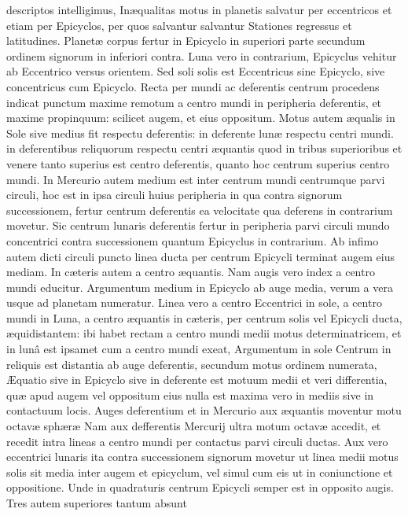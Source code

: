 \documentclass[11pt,a4paper]{article}
\begin{document}
descriptos intelligimus, Inæqualitas motus in planetis salvatur per eccentricos et etiam per Epicyclos, per quos salvantur salvantur Stationes regressus et latitudines.
Planetæ corpus fertur in Epicyclo in superiori parte secundum ordinem signorum in inferiori contra. Luna vero in contrarium, Epicyclus vehitur ab Eccentrico versus orientem. Sed soli solis est Eccentricus sine Epicyclo, sive concentricus cum Epicyclo. Recta per mundi ac deferentis centrum procedens indicat punctum maxime remotum a centro mundi in peripheria deferentis, et maxime propinquum: scilicet augem, et eius oppositum. Motus autem æqualis in Sole sive medius fit respectu deferentis: in deferente lunæ respectu centri mundi. in deferentibus reliquorum respectu centri æquantis quod in tribus superioribus et venere tanto superius est centro deferentis, quanto hoc centrum superius centro mundi. In Mercurio autem medium est inter centrum mundi centrumque parvi circuli, hoc est in ipsa circuli huius peripheria in qua contra signorum successionem, fertur centrum deferentis ea velocitate qua deferens in contrarium movetur. Sic centrum lunaris deferentis fertur in peripheria parvi circuli mundo concentrici contra successionem quantum Epicyclus in contrarium. Ab infimo autem dicti circuli puncto linea ducta per centrum Epicycli terminat augem eius mediam. In cæteris autem a centro æquantis. Nam augis vero index a centro mundi educitur. Argumentum medium in Epicyclo ab auge media, verum a vera usque ad planetam numeratur. Linea vero a centro Eccentrici in sole, a centro mundi in Luna, a centro æquantis in cæteris, per centrum solis vel Epicycli ducta, æquidistantem: ibi habet rectam a centro mundi medii motus determinatricem, et in lunâ est ipsamet cum a centro mundi exeat, Argumentum in sole Centrum in reliquis est distantia ab auge deferentis, secundum motus ordinem numerata, Æquatio sive in Epicyclo sive in deferente est motuum medii et veri differentia, quæ apud augem vel oppositum eius nulla est maxima vero in mediis sive in contactuum locis. Auges deferentium et in Mercurio aux æquantis moventur motu octavæ sphæræ Nam aux defferentis Mercurij ultra motum octavæ accedit, et recedit intra lineas a centro mundi per contactus parvi circuli ductas. Aux vero eccentrici lunaris ita contra successionem signorum movetur ut linea medii motus solis sit media inter augem et epicyclum, vel simul cum eis ut in coniunctione et oppositione. Unde in quadraturis centrum Epicycli semper est in opposito augis. Tres autem superiores tantum absunt
\end{document}
